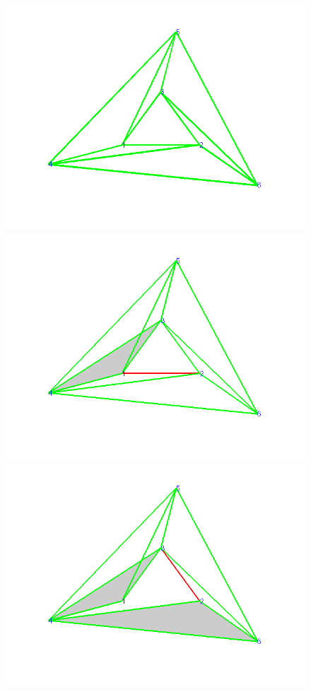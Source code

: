 \documentclass[12pt]{article}
\begin{document}
\begin{figure}
\includegraphics[scale = .45]{Pictures3/triEx1.png}
\includegraphics[scale = .45]{Pictures3/triExD1.png}
\includegraphics[scale = .45]{Pictures3/triExD2.png}

\end{figure}
\end{document}
